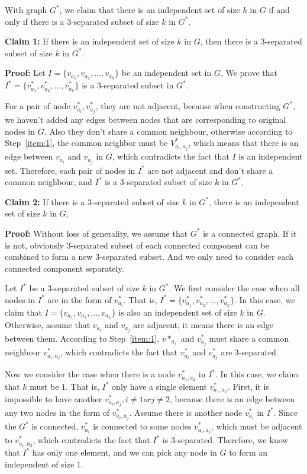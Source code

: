 \documentclass[paper=a4, fontsize=11pt]{scrartcl} %
\numberwithin{equation}{section} %
\numberwithin{figure}{section} %
\numberwithin{table}{section} %
\begin{document}
With graph $G^*$, we claim that there is an independent set of size $k$ in $G$ if and only if there is a
$3$-separated subset of size $k$ in $G^*$.

\vspace{0.2cm}
\textbf{Claim 1:}
If there is an independent set of size $k$ in $G$, then there is a $3$-separated subset of size $k$ in $G^*$.

\textbf{Proof:}
Let $I = \{v_{a_1}, v_{a_2},\dots, v_{a_k}\}$ be an independent set in $G$. We prove that 
$I^* = \{v_{a_1}^*,  v_{a_2}^*,\dots, v_{a_k}^*\}$ is a $3$-separated subset in $G^*$.

For a pair of node $v^*_{a_i}, v_{a_j}^*$, they are not adjacent, because when constructing $G^*$,
we haven't added any edges between  nodes that are corresponding to original nodes in $G$. Also they
don't share a common neighbour, otherwise according to Step~\ref{item:1}, the common neighbor must
be $V^*_{a_i, a_j}$, which means that there is an edge between $v_{a_i}$ and $v_{a_j}$ in $G$,
which contradicts the fact that $I$ is an independent set. Therefore, each pair of nodes in $I^*$
are not adjacent and don't share a common neighbour, and $I^*$ is a $3$-separated subset of size $k$
in $G^*$.

\vspace{0.2cm}
\textbf{Claim 2:}
If there is a $3$-separated subset of size $k$ in $G^*$, there is an independent set of size $k$ in $G$,   

\textbf{Proof:}
Without loss of generality, we assume that $G^*$ is a connected graph. If it is not, obviously 
$3$-separated subset of each connected component can be combined to form a new $3$-separated subset.
And we only need to consider each connected component separately. 

\vspace{0.2cm}
Let $I^*$ be a $3$-separated subset of size $k$ in $G^*$.  
We first consider the case when all nodes in $I^*$ are in the form of $v^*_{a_i}$. That is,
$I^* = \{v_{a_1}^*,  v_{a_2}^*,\dots, v_{a_k}^*\}$. In this case, we claim that 
$I = \{v_{a_1}, v_{a_2}, \dots, v_{a_k}\}$ is also an independent set of size $k$ in $G$. Otherwise,
assume that $v_{a_i}$ and $v_{a_j}$ are adjacent, it means there is an edge between them. According
to Step~\ref{item:1}, $v*_{a_i}$ and $v^*_{a_j}$  must share a common neighbour $v^*_{a_i, a_j}$,
which contradicts the fact that $v^*_{a_i}$ and $v^*_{a_j}$ are $3$-separated.

\vspace{0.2cm}
Now we consider the case when there is a node $v^*_{a_1, a_2}$ in $I^*$. In this case, we claim that 
$k$ must be $1$. That is, $I^*$ only have a single element $v^*_{a_1, a_2}$. First, it is impossible
to have another $v^*_{a_i, a_j}, i \neq 1 or j \neq 2$, because there is an edge between any two
nodes in the form of $v^*_{a_i, a_j}$. Assume there is another node $v^*_{a_i}$ in $I^*$. Since the
$G^*$ is connected, $v^*_{a_i}$ is connected to some nodes $v^*_{a_i, a_j}$, which must be adjacent
to $v^*_{a_1, a_2}$, which contradicts the fact that $I^*$ is $3$-separated. Therefore, we know that 
$I^*$ has only one element, and we can pick any node in $G$ to form an independent of size $1$.
\end{document}
